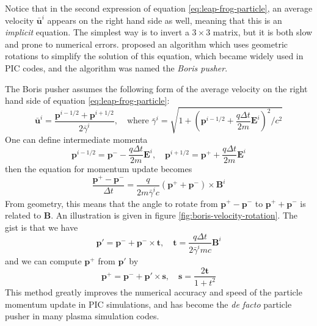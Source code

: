 Notice that in the second expression of equation \eqref{eq:leap-frog-particle},
an average velocity $\bar{\mathbf{u}}^{i}$ appears on the right hand side as
well, meaning that this is an {\it implicit} equation. The simplest way is to
invert a $3\times 3$ matrix, but it is both slow and prone to numerical errors.
\citet{boris_relativistic_1970} proposed an algorithm which uses geometric rotations to
simplify the solution of this equation, which became widely used in PIC codes,
and the algorithm was named the {\it Boris pusher}.

The Boris pusher assumes the following form of the average velocity on the right
hand side of equation \eqref{eq:leap-frog-particle}:
\begin{equation}
  \label{eq:boris-average-u}
  \bar{\mathbf{u}}^{i} = \frac{\mathbf{p}^{i-1/2} + \mathbf{p}^{i+1/2}}{2\bar{\gamma}^i},\quad \text{where } \bar{\gamma}^i = \sqrt{1 + \left( \mathbf{p}^{i-1/2} + \frac{q\Delta t}{2m}\mathbf{E}^i \right)^2/c^2}
\end{equation}
One can define intermediate momenta
\begin{equation}
  \label{eq:boris-intermediate-momenta}
  \mathbf{p}^{i-1/2} = \mathbf{p}^{-} - \frac{q\Delta t}{2m}\mathbf{E}^{i},\quad \mathbf{p}^{i+1/2} = \mathbf{p}^{+} + \frac{q\Delta t}{2m}\mathbf{E}^i
\end{equation}
then the equation for momentum update becomes
\begin{equation}
  \label{eq:boris-momentum-update}
  \frac{\mathbf{p}^+-\mathbf{p}^{-}}{\Delta t} = \frac{q}{2m \bar{\gamma}^ic}(\mathbf{p}^+ + \mathbf{p}^{-})\times \mathbf{B}^{i}
\end{equation}
From geometry, this means that the angle to rotate from
$\mathbf{p}^+-\mathbf{p}^{-}$ to $\mathbf{p}^++\mathbf{p}^{-}$ is related to
$\mathbf{B}$. An illustration is given in figure
\ref{fig:boris-velocity-rotation}. The gist is that we have
\begin{equation}
  \mathbf{p}' = \mathbf{p}^{-} + \mathbf{p}^{-}\times \mathbf{t},\quad \mathbf{t} = \frac{q\Delta t}{2\bar{\gamma}^imc}\mathbf{B}^{i}
\end{equation}
and we can compute $\mathbf{p}^{+}$ from $\mathbf{p}'$ by
\begin{equation}
  \mathbf{p}^+ = \mathbf{p}^{-} + \mathbf{p}'\times \mathbf{s},\quad \mathbf{s} = \frac{2\mathbf{t}}{1 + t^2}
\end{equation}
This method greatly improves the numerical accuracy and speed of the particle
momentum update in PIC simulations, and has become the {\it de facto} particle
pusher in many plasma simulation codes.

